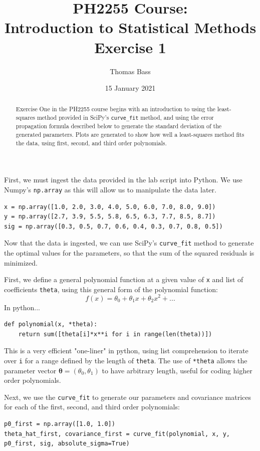 \documentclass[a4paper]{article}
\title{PH2255 Course:\\
Introduction to Statistical Methods\\Exercise 1}
\author{Thomas Bass}
\date{15 January 2021}
\begin{document}
\maketitle

\begin{abstract}
Exercise One in the PH2255 course begins with an introduction to using the least-squares method provided in SciPy's \lstinline$curve_fit$ method, and using the error propagation formula described below to generate the standard deviation of the generated parameters. Plots are generated to show how well a least-squares method fits the data, using first, second, and third order polynomials.
\end{abstract}

First, we must ingest the data provided in the lab script into Python. We use Numpy's \lstinline$np.array$ as this will allow us to manipulate the data later.
\begin{lstlisting}
x = np.array([1.0, 2.0, 3.0, 4.0, 5.0, 6.0, 7.0, 8.0, 9.0])
y = np.array([2.7, 3.9, 5.5, 5.8, 6.5, 6.3, 7.7, 8.5, 8.7])
sig = np.array([0.3, 0.5, 0.7, 0.6, 0.4, 0.3, 0.7, 0.8, 0.5])
\end{lstlisting}
Now that the data is ingested, we can use SciPy's \lstinline$curve_fit$ method to generate the optimal values for the parameters, so that the sum of the squared residuals is minimized. 

First, we define a general polynomial function at a given value of \lstinline$x$ and list of coefficients \lstinline$theta$, using this general form of the polynomial function:
\begin{equation}
f(x) = \theta_0 + \theta_1 x + \theta_2x^2 + ...
\end{equation}
In python...
\begin{lstlisting}
def polynomial(x, *theta): 
	return sum([theta[i]*x**i for i in range(len(theta))])
\end{lstlisting}

This is a very efficient "one-liner" in python, using list comprehension to iterate over \lstinline$i$ for a range defined by the length of \lstinline$theta$. The use of \lstinline$*theta$ allows the parameter vector $\bm\theta = (\theta_0, \theta_1)$ to have arbitrary length, useful for coding higher order polynomials.

Next, we use the \lstinline$curve_fit$ to generate our parameters and covariance matrices for each of the first, second, and third order polynomials:
\begin{lstlisting}
p0_first = np.array([1.0, 1.0])
theta_hat_first, covariance_first = curve_fit(polynomial, x, y, p0_first, sig, absolute_sigma=True)
\end{lstlisting}
\end{document}
